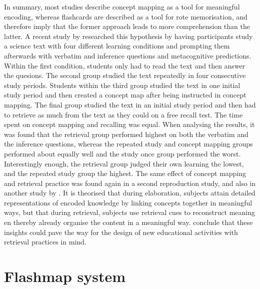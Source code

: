 In summary, most studies describe concept mapping as a tool for meaningful encoding, whereas flashcards are described as a tool for rote memorisation, and therefore imply that the former approach leads to more comprehension than the latter. A recent study by  researched this hypothesis by having participants study a science text with four different learning conditions and prompting them afterwards with verbatim and inference questions and metacognitive predictions. Within the first condition, students only had to read the text and then answer the quesions. The second group studied the text repeatedly in four consecutive study periods. Students within the third group studied the text in one initial study period and then created a concept map after being instructed in concept mapping. The final group studied the text in an initial study period and then had to retrieve as much from the text as they could on a free recall test. The time spent on concept mapping and recalling was equal. When analysing the results, it was found that the retrieval group performed highest on both the verbatim and the inference questions, whereas the repeated study and concept mapping groups performed about equally well and the study once group performed the worst. Interestingly enough, the retrieval group judged their own learning the lowest, and the repeated study group the highest. The same effect of concept mapping and retrieval practice was found again in a second reproduction study, and also in another study by . It is theorised that during elaboration, subjects attain detailed representations of encoded knowledge by linking concepts together in meaningful ways, but that during retrieval, subjects use retrieval cues to reconstruct meaning en thereby already organise the content in a meaningful way.  conclude that these insights could pave the way for the design of new educational activities with retrieval practices in mind.

\section{Flashmap system}
\label{sec:intro_flashmap}

